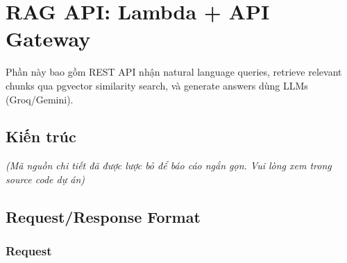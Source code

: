 \hypertarget{rag-api-lambda-api-gateway}{%
\section{RAG API: Lambda + API
Gateway}}

Phần này bao gồm REST API nhận natural language queries, retrieve
relevant chunks qua pgvector similarity search, và generate answers dùng
LLMs (Groq/Gemini).

\hypertarget{kiux1ebfn-truxfac}{%
\subsection{Kiến trúc}}

\emph{(Mã nguồn chi tiết đã được lược bỏ để báo cáo ngắn gọn. Vui lòng
xem trong source code dự án)}

\hypertarget{requestresponse-format}{%
\subsection{Request/Response Format}}

\hypertarget{request}{%
\subsubsection{Request}}

\begin{Shaded}
\begin{Highlighting}[]
 
 

\FunctionTok{\{}
  \FunctionTok{:} \FunctionTok{,}
  \FunctionTok{:} \FunctionTok{,}      \ErrorTok{//} \FunctionTok{:} \FunctionTok{,} \FunctionTok{,} 
  \FunctionTok{:} \FunctionTok{,}                        \ErrorTok{//} \FunctionTok{:}  
  \ErrorTok{:}                 \ErrorTok{//}   \ErrorTok{=}   \FunctionTok{,}  
\FunctionTok{\}}
\end{Highlighting}
\end{Shaded}

